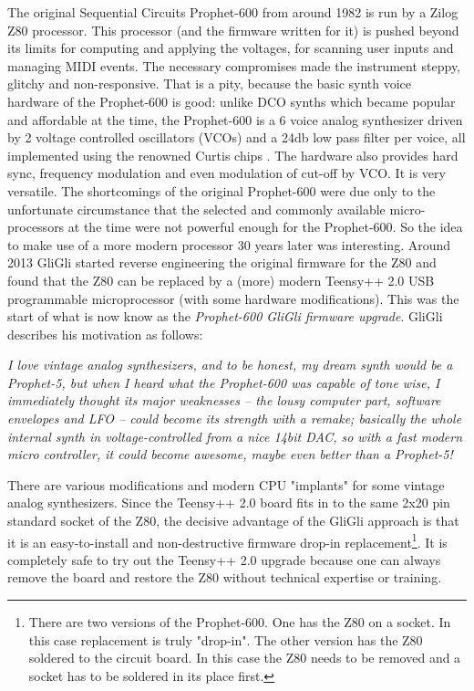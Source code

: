\documentclass[landscape, 11pt, oneside, twoside]{report}
\newenvironment{flowtext}{\addmargin[0cm]{0cm}}{\endaddmargin} %
\begin{document}
\setcounter{page}{1}

\begin{flowtext}

The original Sequential Circuits Prophet-600 from around 1982 is run by a Zilog Z80 processor. This processor (and the firmware written for it) is pushed beyond its limits for computing and applying the voltages, for scanning user inputs and managing MIDI events. The necessary compromises made the instrument steppy, glitchy and non-responsive. That is a pity, because the basic synth voice hardware of the Prophet-600 is good: unlike DCO synths which became popular and affordable at the time, the Prophet-600 is a 6 voice analog synthesizer driven by 2 voltage controlled oscillators (VCOs) and a 24db low pass filter per voice, all implemented using the renowned Curtis chips \cite{curtis}. The hardware also provides hard sync, frequency modulation and even modulation of cut-off by VCO. It is very versatile. The shortcomings of the original Prophet-600 were due only to the unfortunate circumstance that the selected and commonly available micro-processors at the time were not powerful enough for the Prophet-600. So the idea to make use of a more modern processor 30 years later was interesting. Around 2013 GliGli \cite{gligli} started reverse engineering the original firmware for the Z80 and found that the Z80 can be replaced by a (more) modern Teensy++ 2.0 USB programmable microprocessor \cite{teensy} (with some hardware modifications). This was the start of what is now know as the \textit{Prophet-600 GliGli firmware upgrade}. GliGli describes his motivation as follows:

\begin{addmargin}[2cm]{1cm}

\textit{I love vintage analog synthesizers, and to be honest, my dream synth would be a Prophet-5, but when I heard what the Prophet-600 was capable of tone wise, I immediately thought its major weaknesses -- the lousy computer part, software envelopes and LFO -- could become its strength with a remake; basically the whole internal synth in voltage-controlled from a nice 14bit DAC, so with a fast modern micro controller, it could become awesome, maybe even better than a Prophet-5!}

\end{addmargin}

There are various modifications and modern CPU "implants" for some vintage analog synthesizers. Since the Teensy++ 2.0 board fits in to the same 2x20 pin standard socket of the Z80, the decisive advantage of the GliGli approach is that it is an easy-to-install and non-destructive firmware drop-in replacement\footnote{There are two versions of the Prophet-600. One has the Z80 on a socket. In this case replacement is truly "drop-in". The other version has the Z80 soldered to the circuit board. In this case the Z80 needs to be removed and a socket has to be soldered in its place first.}. It is completely safe to try out the Teensy++ 2.0 upgrade because one can always remove the board and restore the Z80 without technical expertise or training. 


\end{flowtext}
\end{document}
